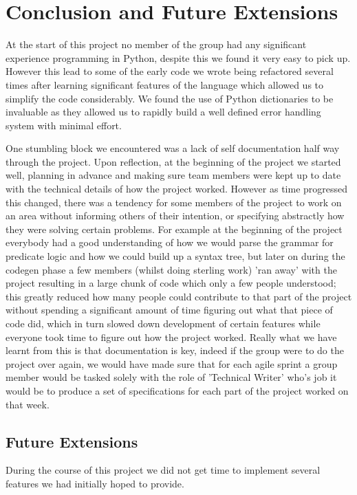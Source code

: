 \documentclass[a4paper, 11pt]{article}
\begin{document}
\section{Conclusion and Future Extensions}

  At the start of this project no member of the group had any significant
  experience programming in Python, despite this we found it very easy to pick
  up. However this lead to some of the early code we
  wrote being refactored several times after learning significant features
  of the language which allowed us to simplify the code considerably. We found 
  the use of Python dictionaries to be invaluable as they allowed us to 
  rapidly build a well defined error handling system with minimal effort.
  
  
  One stumbling block we encountered was a lack of self documentation half way
  through the project. Upon reflection, at the beginning of the project we 
  started well, planning in advance and making sure team members were kept up 
  to date with the technical details of how the project worked. However as time 
  progressed this changed, there was a tendency for some members of the project 
  to work on an area without informing others of their intention, or specifying 
  abstractly how they were solving certain problems. For example at the beginning 
  of the project everybody had a good understanding of how we would parse the 
  grammar for predicate logic and how we could build up a syntax tree, but later 
  on during the codegen phase a few members (whilst doing sterling work) 'ran away'
  with the project resulting in a large chunk of code which only a few people
  understood; this greatly reduced how many people could contribute to that part
  of the project without spending a significant amount of time figuring out what
  that piece of code did, which in turn slowed down development of certain
  features while everyone took time to figure out how the project worked.
  Really what we have learnt from this is that documentation is key, indeed if the
  group were to do the project over again, we would have made sure that for each
  agile sprint a group member would be tasked solely with the role of 'Technical
  Writer' who's job it would be to produce a set of specifications for each part
  of the project worked on that week. 


  \subsection{Future Extensions}
    During the course of this project we did not get time to implement several
    features we had initially hoped to provide. 
\end{document}
